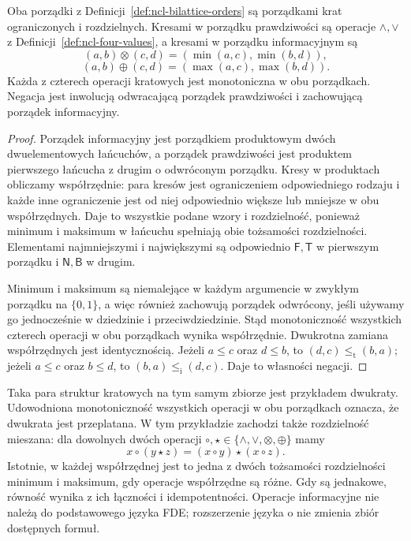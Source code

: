 \begin{twierdzenie}
\label{thm:ncl-four-bilattice}
Oba porządki z Definicji~\ref{def:ncl-bilattice-orders}
są porządkami krat ograniczonych i rozdzielnych.
Kresami w porządku prawdziwości są operacje
$\wedge,\vee$ z Definicji~\ref{def:ncl-four-values},
a kresami w porządku informacyjnym są
\[
 (a,b)\otimes(c,d)=(\min(a,c),\min(b,d)),
\]
\[
 (a,b)\oplus(c,d)=(\max(a,c),\max(b,d)).
\]
Każda z czterech operacji kratowych jest monotoniczna
w obu porządkach. Negacja jest inwolucją odwracającą
porządek prawdziwości i zachowującą porządek informacyjny.
\end{twierdzenie}
\begin{proof}
Porządek informacyjny jest porządkiem produktowym
dwóch dwuelementowych łańcuchów, a porządek prawdziwości
jest produktem pierwszego łańcucha z drugim o odwróconym
porządku. Kresy w produktach obliczamy współrzędnie:
para kresów jest ograniczeniem odpowiedniego rodzaju
i każde inne ograniczenie jest od niej odpowiednio
większe lub mniejsze w obu współrzędnych.
Daje to wszystkie podane wzory i rozdzielność, ponieważ
minimum i maksimum w łańcuchu spełniają obie tożsamości
rozdzielności. Elementami najmniejszymi i największymi
są odpowiednio $\mathsf F,\mathsf T$ w pierwszym
porządku i $\mathsf N,\mathsf B$ w drugim.

Minimum i maksimum są niemalejące w każdym argumencie
w zwykłym porządku na $\{0,1\}$, a więc również
zachowują porządek odwrócony, jeśli używamy go
jednocześnie w dziedzinie i przeciwdziedzinie.
Stąd monotoniczność wszystkich czterech operacji
w obu porządkach wynika współrzędnie.
Dwukrotna zamiana współrzędnych jest identycznością.
Jeżeli $a\leq c$ oraz $d\leq b$, to
$(d,c)\leq_{\mathrm t}(b,a)$; jeżeli $a\leq c$
oraz $b\leq d$, to $(b,a)\leq_{\mathrm i}(d,c)$.
Daje to własności negacji.
\end{proof}
Taka para struktur kratowych na tym samym zbiorze
jest przykładem dwukraty. Udowodniona monotoniczność
wszystkich operacji w obu porządkach oznacza, że
dwukrata jest przeplatana. W tym przykładzie zachodzi
także rozdzielność mieszana: dla dowolnych dwóch
operacji $\circ,\star\in\{\wedge,\vee,\otimes,\oplus\}$
mamy
\[
 x\circ(y\star z)=(x\circ y)\star(x\circ z).
\]
Istotnie, w każdej współrzędnej jest to jedna z dwóch
tożsamości rozdzielności minimum i maksimum, gdy
operacje współrzędne są różne. Gdy są jednakowe,
równość wynika z ich łączności i idempotentności.
Operacje informacyjne
nie należą do podstawowego języka FDE; rozszerzenie
języka o nie zmienia zbiór dostępnych formuł.

